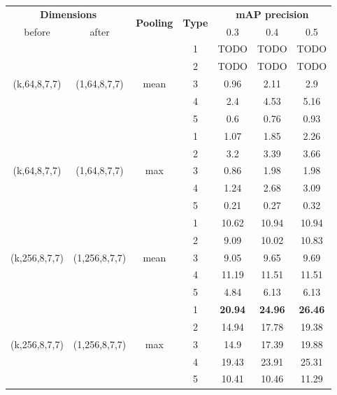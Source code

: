 \documentclass{report}
\begin{document}
\begin{center}
\begin{longtable}{||c | c | c| c||c c c||}

  \hline
  \multicolumn{2}{||c|}{\textbf{Dimensions}} & \multirow{2}{*}{ \textbf{Pooling}} &\multirow{2}{*}{\textbf{Type}} & \multicolumn{3}{|c||}{\textbf{mAP precision}}\\

   before & after &  {} & {} &  0.3 &  0.4 & 0.5 \\
 \hline   \hline
 \multirow{5}{*}{(k,64,8,7,7)} & \multirow{5}{*}{(1,64,8,7,7)} & \multirow{5}{*}{mean}  & 1 & TODO & TODO & TODO  \\
  \cline{4-7}
  {} & {} & {} & 2 & TODO & TODO & TODO \\
    \cline{4-7}
  {} & {} & {} & 3 & 0.96 & 2.11 & 2.9   \\
    \cline{4-7}
  {} & {} & {} & 4 &  2.4  & 4.53 & 5.16    \\
    \cline{4-7}
  {} & {} & {} & 5 &  0.6  & 0.76 & 0.93    \\
  \hline
 \multirow{5}{*}{(k,64,8,7,7)} & \multirow{5}{*}{(1,64,8,7,7)} & \multirow{5}{*}{max}  & 1 &  1.07 & 1.85 & 2.26    \\
    \cline{4-7}
  {} & {} & {} & 2 &  3.2 & 3.39 & 3.66    \\
    \cline{4-7}
  {} & {} & {} & 3 &  0.86 & 1.98 & 1.98    \\
    \cline{4-7}
  {} & {} & {} & 4 &  1.24 & 2.68 & 3.09    \\
    \cline{4-7}
  {} & {} & {} & 5 &  0.21 & 0.27 & 0.32    \\

  \hline   \hline

 \multirow{5}{*}{(k,256,8,7,7)} & \multirow{5}{*}{(1,256,8,7,7)} & \multirow{5}{*}{mean}  & 1 &  10.62 & 10.94 & 10.94    \\

    \cline{4-7}
  {} & {} & {} & 2 &  9.09  & 10.02 & 10.83   \\
    \cline{4-7}
  {} & {} & {} & 3 &  9.05  & 9.65  & 9.69    \\
    \cline{4-7}
  {} & {} & {} & 4 &  11.19 & 11.51 & 11.51   \\
    \cline{4-7}
  {} & {} & {} & 5 &  4.84  & 6.13  & 6.13   \\
    \hline
 \multirow{5}{*}{(k,256,8,7,7)} & \multirow{5}{*}{(1,256,8,7,7)} & \multirow{5}{*}{max}  & 1  & \bf 20.94 & \bf 24.96 & \bf 26.46   \\
    \cline{4-7}
  {} & {} & {} & 2  & 14.94 & 17.78 & 19.38   \\
    \cline{4-7}
  {} & {} & {} & 3  & 14.9 & 17.39 & 19.88   \\
    \cline{4-7}
  {} & {} & {} & 4  & 19.43 & 23.91 & 25.31   \\
    \cline{4-7}
  {} & {} & {} & 5  & 10.41 & 10.46 & 11.29   \\
  \hline   
  

\end{longtable}
\end{center}
\end{document}
